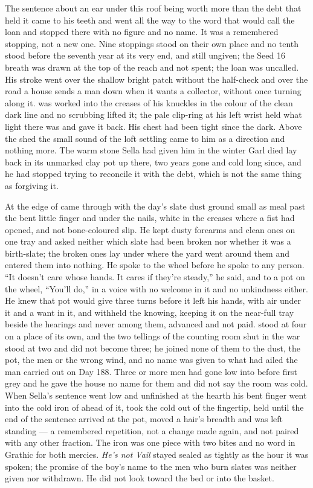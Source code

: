 The sentence about an ear under this roof being worth more than the debt that held it came to his teeth and went all the way to the word that would call the loan and stopped there with no figure and no name. It was a remembered stopping, not a new one. Nine stoppings stood on their own place and no tenth stood before the seventh year at its very end, and still ungiven; the Seed 16 breath was drawn at the top of the reach and not spent; the loan was uncalled. His stroke went over the shallow bright patch without the half-check and over the road a house sends a man down when it wants a collector, without once turning along it.  was worked into the creases of his knuckles in the colour of the clean dark line and no scrubbing lifted it; the pale clip-ring at his left wrist held what light there was and gave it back. His chest had been tight since the dark. Above the shed the small sound of the loft settling came to him as a direction and nothing more. The warm stone Sella had given him in the winter Garl died lay back in its unmarked clay pot up there, two years gone and cold long since, and he had stopped trying to reconcile it with the debt, which is not the same thing as forgiving it.

At the edge of   came through with the day's slate dust ground small as meal past the bent little finger and under the nails, white in the creases where a fist had opened, and not bone-coloured slip. He kept dusty forearms and clean ones on one tray and asked neither which slate had been broken nor whether it was a birth-slate; the broken ones lay under  where the yard went around them and entered them into nothing. He spoke to the wheel before he spoke to any person. “It doesn't care whose hands. It cares if they're steady,” he said, and to a pot on the wheel, “You'll do,” in a voice with no welcome in it and no unkindness either. He knew  that pot would give three turns before it left his hands, with air under it and a want in it, and withheld the knowing, keeping it on the near-full tray beside the hearings and never among them, advanced and not paid.  stood at four on a place of its own, and the two tellings of the counting room shut in the war stood at two and did not become three; he joined none of them to the dust, the pot, the men or the wrong wind, and no name was given to what had ailed the man carried out on Day 188. Three or more men had gone low into  before first grey and he gave the house no name for them and did not say the room was cold. When Sella's sentence went low and unfinished at the hearth his bent finger went into the cold iron of  ahead of it, took the cold out of the fingertip, held until the end of the sentence arrived at the pot, moved a hair's breadth and was left standing --- a remembered repetition, not a change made again, and not paired with any other fraction. The iron was one piece with two bites and no word in Grathic for both mercies. \emph{He's not Vail} stayed sealed as tightly as the hour it was spoken; the promise of the boy's name to the men who burn slates was neither given nor withdrawn. He did not look toward the bed or into the basket.

